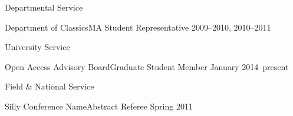 

\headedsection %
{Departmental Service}
{} {

\headedsubsection %
{Department of Classics\bull \textnormal{MA
    Student Representative}}
{2009--2010, 2010--2011}
{\vspace{-0.5\baselineskip}}

}

\headedsection %
{University Service}
{} {

\headedsubsection %
{Open Access Advisory Board\bull \textnormal{Graduate Student Member}}
{January 2014--present}
{\vspace{-0.5\baselineskip}}

}

\headedsection %
{Field \& National Service}
{} {

\headedsubsection %
{Silly Conference Name\bull \textnormal{Abstract Referee}}
{Spring 2011}
{\vspace{-0.5\baselineskip}}

}


\spacedhrule{0.5em}{-0.4em} %
